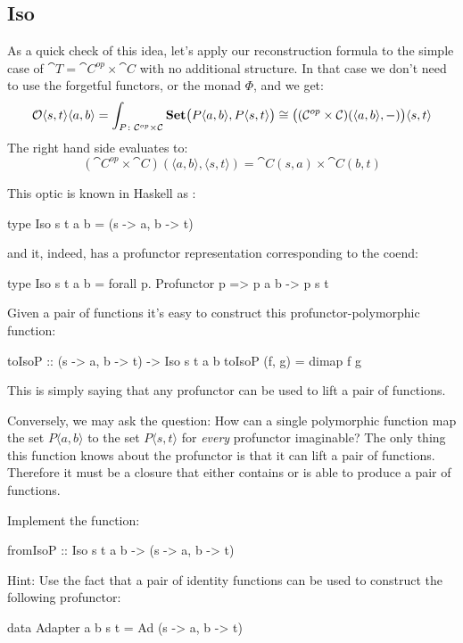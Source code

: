 \documentclass[DaoFP]{subfiles}
\begin{document}
\subsection{Iso}
As a quick check of this idea, let's apply our reconstruction formula to the simple case of $\cat T = \cat C^{op} \times \cat C$ with no additional structure. In that case we don't need to use the forgetful functors, or the monad $\Phi$, and we get:
\[  \mathcal{O}\langle s, t\rangle \langle a, b \rangle =\int_{P \colon \mathcal{C}^{op} \times \mathcal{C}} \mathbf{Set} \big(P \langle a, b\rangle, P \langle s, t\rangle \big) \cong \big( (\mathcal{C}^{op} \times \mathcal{C}) (\langle a, b\rangle ,-) \big) \langle s, t\rangle \]
The right hand side evaluates to:
\[ (\cat C^{op} \times \cat C) (\langle a, b\rangle , \langle s, t\rangle) = \cat C (s, a) \times \cat C (b, t) \]

This optic is known in Haskell as :
\begin{haskell}
type Iso s t a b = (s -> a, b -> t)
\end{haskell}
and it, indeed, has a profunctor representation corresponding to the coend:
\begin{haskell}
type Iso s t a b = forall p. Profunctor p => p a b -> p s t
\end{haskell}

Given a pair of functions it's easy to construct this profunctor-polymorphic function:
\begin{haskell}
toIsoP :: (s -> a, b -> t) -> Iso s t a b
toIsoP (f, g) = dimap f g
\end{haskell}
This is simply saying that any profunctor can be used to lift a pair of functions. 

Conversely, we may ask the question: How can a single polymorphic function map the set $P \langle a, b \rangle$ to the set $P \langle s, t \rangle$ for \emph{every} profunctor imaginable? The only thing this function knows about the profunctor is that it can lift a pair of functions. Therefore it must be a closure that either contains or is able to produce a pair of functions. 

\begin{exercise}
Implement the function:
\begin{haskell}
fromIsoP :: Iso s t a b -> (s -> a, b -> t)
\end{haskell}
Hint: Use the fact that a pair of identity functions can be used to construct the following profunctor:
\begin{haskell}
data Adapter a b s t = Ad (s -> a, b -> t)
\end{haskell}
\end{exercise}
\end{document}
